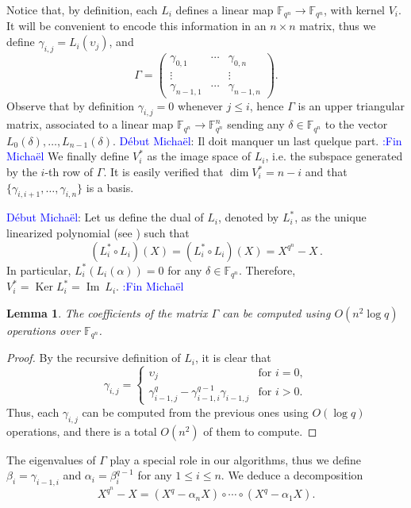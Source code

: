 \documentclass{sig-alternate}
\newcommand{\ff}[1]{\mathbb{F}_{#1}}
\newcommand{\qq}{q}
\newcommand{\nn}{n}
\newcommand{\qn}{{\qq^\nn}}
\newcommand{\extf}{\ff{\qn}}
\DeclareMathOperator{\Ker}{Ker}
\DeclareMathOperator{\Ima}{Im}
\newcounter{algo}
\newcommand{\comd}{\noindent \textcolor{blue}{D\'ebut Micha\"el}:}
\newcommand{\comf}{\noindent \textcolor{blue}{:Fin Micha\"el}}
\newtheorem{Lem}{Lemma}
\begin{document}
Notice that, by definition, each $L_i$ defines a linear map
$\extf\to\extf$, with kernel $V_i$. It will be convenient to encode
this information in an $\nn\times\nn$ matrix, thus we define
$\gamma_{i,j}=L_i(\upsilon_j)$, and
\begin{equation}
  \label{eq:Gamma}
  \Gamma =
  \begin{pmatrix}
    \gamma_{0,1} & \cdots & \gamma_{0,\nn}\\
    \vdots & & \vdots\\
    \gamma_{\nn-1,1} & \cdots & \gamma_{\nn-1,\nn}
  \end{pmatrix}.
\end{equation}
Observe that by definition $\gamma_{i,j}=0$ whenever $j\le i$, hence
$\Gamma$ is an upper triangular matrix, associated to a linear map
$\extf\to\extf^\nn$ sending any $\delta\in\extf$ to the vector
$L_0(\delta),\dots,L_{n-1}(\delta)$.  
\comd
 Il doit manquer un last quelque part.
\comf
We finally define $V_i^\ast$ as
the image space of $L_i$, i.e. the subspace generated by the $i$-th
row of $\Gamma$.  It is easily verified that $\dim V_i^\ast=n-i$ and
that $\{\gamma_{i,i+1},\dots,\gamma_{i,\nn}\}$ is a basis.

\comd
Let us define the dual of $L_i$, denoted by $L_i^\ast$, as the unique linearized polynomial (see
\cite[Ch. 11]{Berlekamp1984}) such that 
$$(L_i^\ast \circ L_i)(X)=(L_i^\ast \circ L_i)(X)=X^\qn-X\,.$$
In particular, $L_i^\ast(L_i(\alpha))=0$ for any $\delta \in \extf$. Therefore, $V_i^\ast=\Ker L_i^\ast=\Ima~L_i$.
\comf


\begin{Lem}
  The coefficients of the matrix $\Gamma$ can be computed using
  $O(\nn^2\log\qq)$ operations over $\extf$.
\end{Lem}
\begin{proof}
  By the recursive definition of $L_i$, it is clear that
  \begin{equation}
    \gamma_{i,j} =
    \begin{cases}
      \upsilon_j &\text{for $i=0$},\\
      \gamma_{i-1,j}^\qq - \gamma_{i-1,i}^{\qq-1}\gamma_{i-1,j} &\text{for $i>0$}.
    \end{cases}
  \end{equation}
  Thus, each $\gamma_{i,j}$ can be computed from the previous ones
  using $O(\log\qq)$ operations, and there is a total $O(\nn^2)$ of
  them to compute.
\end{proof}

The eigenvalues of $\Gamma$ play a special role in our algorithms,
thus we define $\beta_i=\gamma_{i-1,i}$ and $\alpha_i=\beta_i^{\qq-1}$
for any $1\le i \le \nn$. We deduce a decomposition
\begin{equation}
  X^\qn - X = (X^\qq - \alpha_\nn X) \circ \cdots \circ (X^\qq - \alpha_1 X).
\end{equation}
\end{document}

